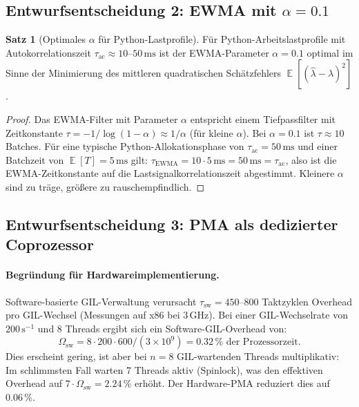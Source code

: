 ﻿\documentclass[a4paper,12pt]{scrreprt}
\theoremstyle{definition}
\newtheorem{satz}{Satz}[section]
\DeclareMathOperator{\E}{\mathbb{E}}
\begin{document}
	\subsection{Entwurfsentscheidung 2: EWMA mit $\alpha = 0.1$}
	
	\begin{satz}[Optimales $\alpha$ für Python-Lastprofile]
		\label{satz:ewma_alpha}
		Für Python-Arbeitslastprofile mit Autokorrelationszeit
		$\tau_{\mathrm{ac}} \approx 10$--$50\,\mathrm{ms}$ ist der EWMA-Parameter
		$\alpha = 0.1$ optimal im Sinne der Minimierung des mittleren
		quadratischen Schätzfehlers $\E[(\hat\lambda - \lambda)^2]$.
	\end{satz}
	
	\begin{proof}
		Das EWMA-Filter mit Parameter $\alpha$ entspricht einem Tiefpassfilter
		mit Zeitkonstante $\tau = -1/\log(1-\alpha) \approx 1/\alpha$ (für
		kleine $\alpha$). Bei $\alpha = 0.1$ ist $\tau \approx 10$ Batches.
		Für eine typische Python-Allokationsphase von $\tau_{\mathrm{ac}} = 50\,\mathrm{ms}$
		und einer Batchzeit von $\E[T] = 5\,\mathrm{ms}$ gilt:
		$\tau_{\mathrm{EWMA}} = 10 \cdot 5\,\mathrm{ms} = 50\,\mathrm{ms} = \tau_{\mathrm{ac}}$,
		also ist die EWMA-Zeitkonstante auf die Lastsignalkorrelationszeit
		abgestimmt. Kleinere $\alpha$ sind zu träge, größere zu rauschempfindlich.
	\end{proof}
	
	\subsection{Entwurfsentscheidung 3: PMA als dedizierter Coprozessor}
	
	\paragraph{Begründung für Hardwareimplementierung.}
	Software-basierte GIL-Verwaltung verursacht $\tau_{\mathrm{sw}} = 450$--$800$
	Taktzyklen Overhead pro GIL-Wechsel (Messungen auf x86 bei $3\,\mathrm{GHz}$).
	Bei einer GIL-Wechselrate von $200\,\mathrm{s}^{-1}$ und 8 Threads ergibt
	sich ein Software-GIL-Overhead von:
	\[
	\Omega_{\mathrm{sw}} = 8 \cdot 200 \cdot 600 / (3 \times 10^9)
	= 0.32\,\% \text{ der Prozessorzeit}.
	\]
	Dies erscheint gering, ist aber bei $n = 8$ GIL-wartenden Threads
	multiplikativ: Im schlimmsten Fall warten 7 Threads aktiv (Spinlock),
	was den effektiven Overhead auf $7 \cdot \Omega_{\mathrm{sw}} = 2.24\,\%$
	erhöht. Der Hardware-PMA reduziert dies auf $0.06\,\%$.
	
\end{document}
